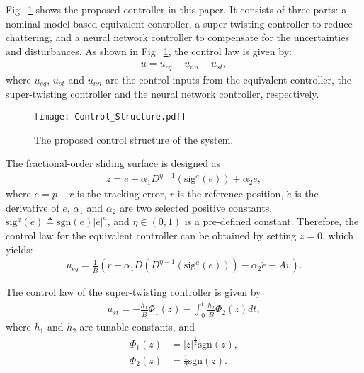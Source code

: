 \documentclass{ifacconf}
\begin{document}
Fig.~\ref{fig:control structure} shows the proposed controller in this paper. It consists of three parts: a nominal-model-based equivalent controller, a super-twisting controller to reduce chattering, and a neural network controller to compensate for the uncertainties and disturbances. As shown in Fig.~\ref{fig:control structure}, the control law is given by:
\begin{align} \label{eq:overall controller}
u=u_{eq}+u_{nn}+u_{st},
\end{align}
where $u_{eq}$, $u_{st}$ and $u_{nn}$ are the control inputs from the equivalent controller, the super-twisting controller and the neural network controller, respectively. 
\begin{figure}[http]
	\centering
	\texttt{[image: Control\_Structure.pdf]}%
	\caption{The proposed control structure of the system.}
	\label{fig:control structure}
\end{figure}


The fractional-order sliding surface is designed as
\begin{align} \label{definition of sliding surface}
    z=\dot{e}+\alpha_1 D^{\eta-1}(\textrm{sig}^a(e))+\alpha_2 e,
\end{align}
where $e=p-r$ is the tracking error, $r$ is the reference position, $\dot{e}$ is the derivative of $e$, $\alpha_1$ and $\alpha_2$ are two selected positive constants. $\textrm{sig}^a(e)\triangleq\textrm{sgn}(e)|e|^a$, and $\eta\in(0,1)$ is a pre-defined constant. Therefore, the control law for the equivalent controller can be obtained by setting $\dot{z}=0$, which yields:
\begin{align}
    u_{eq}=
    \frac{1}{\bar{B}}(\ddot{r}-\alpha_1D(D^{\eta-1}(\textrm{sig}^a(e)))-\alpha_2\dot{e}-\bar{A}v).
\end{align}

The control law of the super-twisting controller is given by
\begin{align}
        u_{st}=-\frac{h_1}{\bar{B}}\Phi_1(z)-\int_0^t\frac{h_2}{\bar{B}}\Phi_2(z) dt,
\end{align}
where $h_1$ and $h_2$ are tunable constants, and
\begin{align}
    \Phi_1(z)&=|z|^{\frac{1}{2}} \textrm{sgn}(z), \\
    \Phi_2(z)&=\frac{1}{2} \textrm{sgn}(z).
\end{align}
\end{document}
